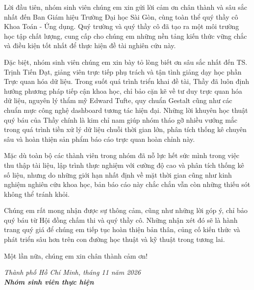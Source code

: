 \documentclass[12pt,a4paper,oneside]{report}
\begin{document}
Lời đầu tiên, nhóm sinh viên chúng em xin gửi lời cảm ơn chân thành và sâu sắc nhất đến Ban Giám hiệu Trường Đại học Sài Gòn, cùng toàn thể quý thầy cô Khoa Toán - Ứng dụng. Quý trường và quý thầy cô đã tạo ra một môi trường học tập chất lượng, cung cấp cho chúng em những nền tảng kiến thức vững chắc và điều kiện tốt nhất để thực hiện đề tài nghiên cứu này.

Đặc biệt, nhóm sinh viên chúng em xin bày tỏ lòng biết ơn sâu sắc nhất đến TS. Trịnh Tiến Đạt, giảng viên trực tiếp phụ trách và tận tình giảng dạy học phần Trực quan hóa dữ liệu. Trong suốt quá trình triển khai đề tài, Thầy đã luôn định hướng phương pháp tiếp cận khoa học, chỉ bảo cặn kẽ về tư duy trực quan hóa dữ liệu, nguyên lý thẩm mỹ Edward Tufte, quy chuẩn Gestalt cũng như các chuẩn mực công nghệ dashboard tương tác hiện đại. Những lời khuyên học thuật quý báu của Thầy chính là kim chỉ nam giúp nhóm tháo gỡ nhiều vướng mắc trong quá trình tiền xử lý dữ liệu chuỗi thời gian lớn, phân tích thống kê chuyên sâu và hoàn thiện sản phẩm báo cáo trực quan hoàn chỉnh này.

Mặc dù toàn bộ các thành viên trong nhóm đã nỗ lực hết sức mình trong việc thu thập tài liệu, lập trình thực nghiệm với cường độ cao và phân tích thống kê số liệu, nhưng do những giới hạn nhất định về mặt thời gian cũng như kinh nghiệm nghiên cứu khoa học, bản báo cáo này chắc chắn vẫn còn những thiếu sót không thể tránh khỏi.

Chúng em rất mong nhận được sự thông cảm, cũng như những lời góp ý, chỉ bảo quý báu từ Hội đồng chấm thi và quý thầy cô. Những nhận xét đó sẽ là hành trang quý giá để chúng em tiếp tục hoàn thiện bản thân, củng cố kiến thức và phát triển sâu hơn trên con đường học thuật và kỹ thuật trong tương lai.

Một lần nữa, chúng em xin chân thành cảm ơn!

\vspace{1.2cm}
\begin{flushright}
\begin{minipage}{7cm}
\centering
\itshape Thành phố Hồ Chí Minh, tháng 11 năm 2026\\
\upshape\bfseries Nhóm sinh viên thực hiện
\end{minipage}
\end{flushright}

\tableofcontents
\listoffigures
\listoftables

\end{document}
